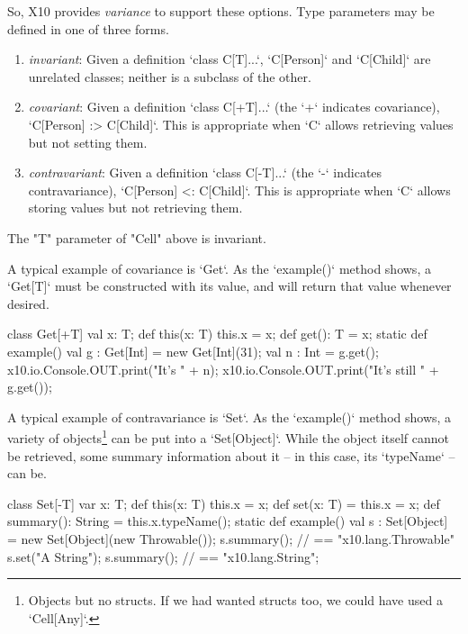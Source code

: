So, X10 provides {\em variance} to support these options.  Type parameters
may be defined in one of three forms.  
\begin{enumerate}
\item {\em invariant}: Given a definition \xcd`class C[T]{...}`, \xcd`C[Person]` and
      \xcd`C[Child]` are unrelated classes; neither is a subclass of the
      other.
\item {\em covariant}: Given a definition \xcd`class C[+T]{...}` (the \xcd`+` indicates
      covariance), \xcd`C[Person] :> C[Child]`.  This is appropriate when
      \xcd`C` allows retrieving values but not setting them.
\item {\em contravariant}: Given a definition \xcd`class C[-T]{...}` (the \xcd`-` indicates
      contravariance), \xcd`C[Person] <: C[Child]`.  This is appropriate when
      \xcd`C` allows storing values but not retrieving them.
\end{enumerate}


The \xcd"T" parameter of \xcd"Cell" above is
invariant.  

A typical example of covariance is \xcd`Get`.  As the \xcd`example()` method
shows, a \xcd`Get[T]` must be constructed with its value, and will return that
value whenever desired.
\begin{xten}
class Get[+T] {
  val x: T;
  def this(x: T) { this.x = x; }
  def get(): T = x;
  static def example() {
     val g : Get[Int] = new Get[Int](31);
     val n : Int = g.get();
     x10.io.Console.OUT.print("It's " + n);
     x10.io.Console.OUT.print("It's still " + g.get());
  }
}
\end{xten}


A typical example of contravariance is \xcd`Set`.  As the \xcd`example()`
method shows,  a variety of objects\footnote{Objects but no structs.  If we
had wanted structs too, we could have used a \xcd`Cell[Any]`.}  can be put
into a 
\xcd`Set[Object]`.  While the object itself cannot be retrieved, some summary
information about it -- in this case, its \xcd`typeName` -- can be.  
\begin{xten}
class Set[-T] {
  var x: T;
  def this(x: T) { this.x = x; }
  def set(x: T) = { this.x = x; } 
  def summary(): String = this.x.typeName();
  static def example() {
    val s : Set[Object] = new Set[Object](new Throwable());
    s.summary(); // == "x10.lang.Throwable"
    s.set("A String");
    s.summary(); // == "x10.lang.String";
  }    
}
\end{xten}
%


